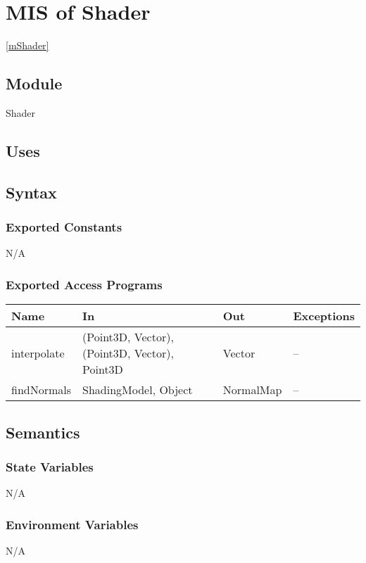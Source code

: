 \documentclass[12pt, titlepage]{article}
\begin{document}
\newpage

\section{MIS of Shader} \ref{mShader} \\

\subsection{Module}
Shader

\subsection{Uses}

\subsection{Syntax}
\subsubsection{Exported Constants}
N/A
\subsubsection{Exported Access Programs}
\begin{center}
	\begin{tabular}{p{3cm} p{4cm} p{2cm} p{4cm}}
		\hline
		\textbf{Name} & \textbf{In} & \textbf{Out} & \textbf{Exceptions} \\
		\hline
		interpolate & (Point3D, Vector), (Point3D, Vector), Point3D & Vector & 
		-- \\
		findNormals & ShadingModel, Object & NormalMap & -- \\
		\hline
	\end{tabular}
\end{center}

\subsection{Semantics}
\subsubsection{State Variables}
N/A
\subsubsection{Environment Variables}
N/A
\end{document}

